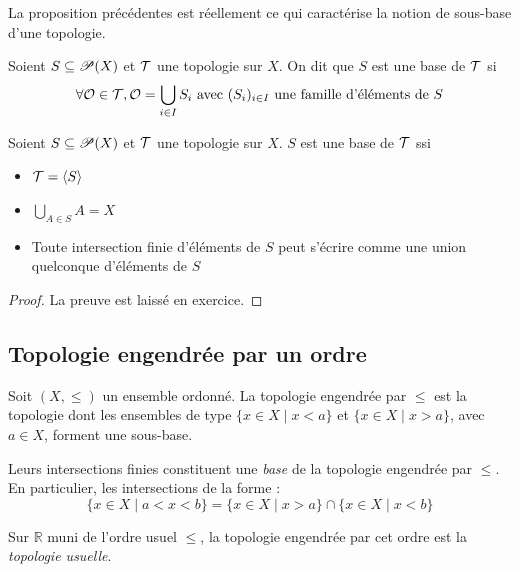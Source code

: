 \begin{remarque}
    La proposition précédentes est réellement ce qui caractérise la notion de sous-base d'une topologie.
\end{remarque}

\begin{definition}
Soient $S\subseteq\mathscr{P}(X)$ et $\mathcal{T}$ une topologie sur $X$. On dit que $S$ est une base de $\mathcal{T}$ si $$
\forall\mathcal{O}\in\mathcal{T},\mathcal{O} = \bigcup_{i\in I}S_i\text{ avec $(S_i)_{i\in I}$ une famille d'éléments de $S$}$$
\end{definition}
\begin{proposition}
    Soient $S\subseteq\mathscr{P}(X)$ et $\mathcal{T}$ une topologie sur $X$. $S$ est une base de $\mathcal{T}$ ssi
    \begin{itemize}
        \item $\mathcal{T}=\langle S\rangle$
        \item $\bigcup_{A\in S}A= X$
        \item Toute intersection finie d'éléments de $S$ peut s'écrire comme une union quelconque d'éléments de $S$
    \end{itemize}
\end{proposition}
\begin{proof}
    La preuve est laissé en exercice.
\end{proof}

\subsection{Topologie engendrée par un ordre}
\begin{definition}
    Soit $(X,\le)$ un ensemble ordonné. La topologie engendrée par $\le$ est la topologie dont les ensembles de type $\{x\in X\mid x < a\}$ et $\{x\in X\mid x>a\}$, avec $a\in X$, forment une sous-base.
\end{definition}

\begin{remarque}
    Leurs intersections finies constituent une \emph{base} de la topologie engendrée par $\leq$. En particulier, les intersections de la forme :
$$\{x \in X \mid a < x < b\} = \{x \in X \mid x > a\} \cap \{x \in X \mid x < b\}$$
\end{remarque}

\begin{exemple}
    Sur $\mathbb{R}$ muni de l'ordre usuel $\leq$, la topologie engendrée par cet ordre est la \emph{topologie usuelle}.
\end{exemple}

